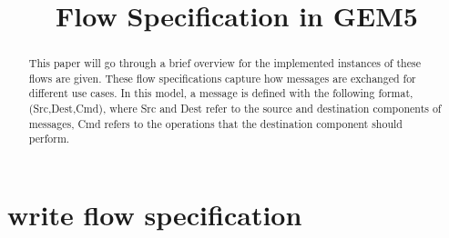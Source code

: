 \documentclass[conference]{IEEEtran}
\begin{document}
\title{Flow Specification in GEM5}

\maketitle


\begin{abstract}
This paper will go through a brief overview for the implemented instances of these flows are given. These flow specifications capture how messages are exchanged for different use cases. In this model, a message is defined with the following format, (Src,Dest,Cmd), where Src and Dest refer to the source and destination components of messages, Cmd refers to the operations that the destination component should perform. 
\end{abstract}



\section{write flow specification}
\end{document}
